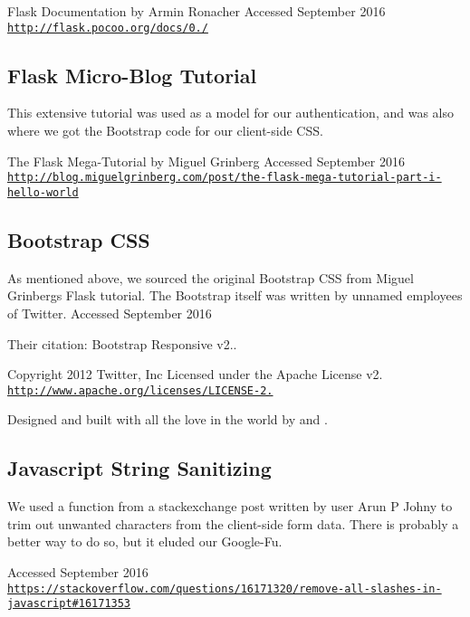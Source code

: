 Flask Documentation by Armin Ronacher Accessed September 2016 \href{http://flask.pocoo.org/docs/0.11/}{\tt http\+://flask.\+pocoo.\+org/docs/0./}\hypertarget{Works_five}{}\subsection{Flask Micro-\/\+Blog Tutorial}\label{Works_five}
This extensive tutorial was used as a model for our authentication, and was also where we got the Bootstrap code for our client-\/side C\+SS.

The Flask Mega-\/\+Tutorial by Miguel Grinberg Accessed September 2016 \href{http://blog.miguelgrinberg.com/post/the-flask-mega-tutorial-part-i-hello-world}{\tt http\+://blog.\+miguelgrinberg.\+com/post/the-\/flask-\/mega-\/tutorial-\/part-\/i-\/hello-\/world}\hypertarget{Works_six}{}\subsection{Bootstrap C\+SS}\label{Works_six}
As mentioned above, we sourced the original Bootstrap C\+SS from Miguel Grinberg\textquotesingle{}s Flask tutorial. The Bootstrap itself was written by unnamed employees of Twitter. Accessed September 2016

Their citation\+: Bootstrap Responsive v2..

Copyright 2012 Twitter, Inc Licensed under the Apache License v2. \href{http://www.apache.org/licenses/LICENSE-2.0}{\tt http\+://www.\+apache.\+org/licenses/\+L\+I\+C\+E\+N\+S\+E-\/2.}

Designed and built with all the love in the world  by  and .\hypertarget{Works_seven}{}\subsection{Javascript String Sanitizing}\label{Works_seven}
We used a function from a stackexchange post written by user \textquotesingle{}Arun P Johny\textquotesingle{} to trim out unwanted characters from the client-\/side form data. There is probably a better way to do so, but it eluded our Google-\/\+Fu.

Accessed September 2016 \href{https://stackoverflow.com/questions/16171320/remove-all-slashes-in-javascript#16171353}{\tt https\+://stackoverflow.\+com/questions/16171320/remove-\/all-\/slashes-\/in-\/javascript\#16171353} 